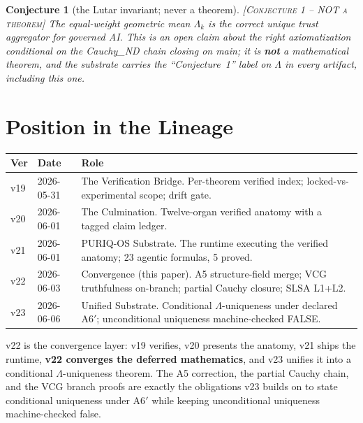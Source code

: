 \documentclass[11pt]{article}
\theoremstyle{plain}
\newtheorem{conjecture}{Conjecture}
\theoremstyle{definition}
\theoremstyle{remark}
\newcommand{\statusConj}{\textcolor{red!70!black}{\textsc{[Conjecture 1 -- NOT a theorem]}}}
\newcommand{\La}{\Lambda}
\begin{document}
\begin{conjecture}[the Lutar invariant; never a theorem] \statusConj
The equal-weight geometric mean $\La_k$ is the correct unique trust aggregator for
governed AI. This is an open claim about the \emph{right} axiomatization conditional
on the Cauchy\_ND chain closing on main; it is \textbf{not} a mathematical theorem,
and the substrate carries the ``Conjecture~1'' label on $\La$ in every artifact,
including this one.
\end{conjecture}

\section{Position in the Lineage}

\begin{center}
\begin{tabular}{@{}llp{9cm}@{}}
\toprule
\textbf{Ver} & \textbf{Date} & \textbf{Role} \\
\midrule
v19 & 2026-05-31 & The Verification Bridge. Per-theorem verified index; locked-vs-experimental scope; drift gate. \\
v20 & 2026-06-01 & The Culmination. Twelve-organ verified anatomy with a tagged claim ledger. \\
v21 & 2026-06-01 & PURIQ-OS Substrate. The runtime executing the verified anatomy; 23 agentic formulas, 5 proved. \\
v22 & 2026-06-03 & Convergence (this paper). A5 structure-field merge; VCG truthfulness on-branch; partial Cauchy closure; SLSA L1+L2. \\
v23 & 2026-06-06 & Unified Substrate. Conditional $\La$-uniqueness under declared A6$'$; unconditional uniqueness machine-checked FALSE. \\
\bottomrule
\end{tabular}
\end{center}

v22 is the convergence layer: v19 verifies, v20 presents the anatomy, v21 ships the
runtime, \textbf{v22 converges the deferred mathematics}, and v23 unifies it into a
conditional $\La$-uniqueness theorem. The A5 correction, the partial Cauchy chain, and
the VCG branch proofs are exactly the obligations v23 builds on to state conditional
uniqueness under A6$'$ while keeping unconditional uniqueness machine-checked false.

\end{document}
